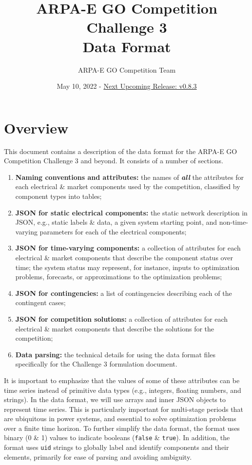 \documentclass{article}
\title{ARPA-E GO Competition Challenge 3 \\ Data Format}
\author{ARPA-E GO Competition Team}
\date{May 10, 2022 - \underline{Next Upcoming Release: v0.8.3}}
\begin{document}
\maketitle





\section{Overview}

This document contains a description of the data format for the ARPA-E GO Competition Challenge 3 and beyond. It consists of a number of sections.
\begin{enumerate}[I]
    \item {\bf Naming conventions and attributes:} the names of \textit{\textbf{all}} the attributes for each electrical \& market components used by the competition, classified by component types into tables;

    \item {\bf JSON for static electrical components:} the static network description in JSON, e.g., static labels \& data, a given system starting point, and non-time-varying parameters for each of the electrical components;

    \item {\bf JSON for time-varying components:} a collection of attributes for each electrical \& market components that describe the component status over time; the system status may represent, for instance, inputs to optimization problems,  forecasts, or approximations to the optimization problems;
    \item {\bf JSON for contingencies:} a list of contingencies describing each of the contingent cases;
    \item {\bf JSON for competition solutions:} a collection of attributes for each electrical \& market components that describe the solutions for the competition;
     \item {\bf Data parsing:}
     the technical details for using the data format files specifically for the Challenge 3 formulation document.
\end{enumerate}
It is important to emphasize that the values of some of these attributes can be time series instead of primitive data types (e.g., integers, floating numbers, and strings).
In the data format, we will use arrays and inner JSON objects to represent time series.
This is particularly important for multi-stage periods that are ubiquitous in power systems, and essential
to solve optimization problems over a finite time horizon.
To further simplify the data format, the format uses binary (0 \& 1) values to indicate booleans (\texttt{false} \& \texttt{true}).
{\color{red}
In addition, the format uses \texttt{uid} strings to globally label and identify components and their elements, primarily for ease of parsing and avoiding ambiguity. 
}
\end{document}
